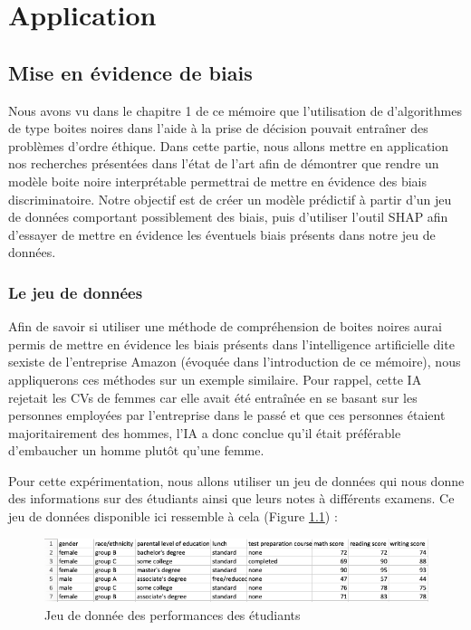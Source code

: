 \chapter{Application}
\section{Mise en évidence de biais}
Nous avons vu dans le chapitre 1 de ce mémoire que l'utilisation de d'algorithmes de type boites noires dans l'aide à la prise de décision pouvait entraîner des problèmes d'ordre éthique. Dans cette partie, nous allons mettre en application nos recherches présentées dans l'état de l'art afin de démontrer que rendre un modèle boite noire interprétable permettrai de mettre en évidence des biais discriminatoire. Notre objectif est de créer un modèle prédictif à partir d'un jeu de données comportant possiblement des biais, puis d'utiliser l'outil SHAP afin d'essayer de mettre en évidence les éventuels biais présents dans notre jeu de données.
\subsection{Le jeu de données}
Afin de savoir si utiliser une méthode de compréhension de boites noires aurai permis de mettre en évidence les biais présents dans l'intelligence artificielle dite sexiste de l'entreprise Amazon (évoquée dans l'introduction de ce mémoire), nous appliquerons ces méthodes sur un exemple similaire. Pour rappel, cette IA rejetait les CVs de femmes car elle avait été entraînée en se basant sur les personnes employées par l'entreprise dans le passé et que ces personnes étaient majoritairement des hommes, l'IA a donc conclue qu'il était préférable d'embaucher un homme plutôt qu'une femme.\par
Pour cette expérimentation, nous allons utiliser un jeu de données qui nous donne des informations sur des étudiants ainsi que leurs notes à différents examens. Ce jeu de données disponible ici \cite{examScore} ressemble à cela (Figure \ref{studentsPerformanceDataSet}) :
\newpage
\begin{figure}[h]
    \includegraphics[scale=0.65]{src_img/studentsPerformanceDataSet.png}
    \caption{Jeu de donnée des performances des étudiants}
    \label{studentsPerformanceDataSet}
\end{figure}


